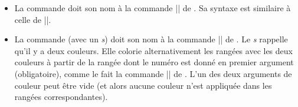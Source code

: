 \documentclass[dvipsnames]{article}%
\begin{document}
\begin{itemize}
\begin{scope}
\hfuzz=10cm
\begin{Code}[width=9cm]
$\begin{NiceArray}{lll}[hvlines]
\CodeBefore
  \emph{\rowcolor{red!15}{1,3-5,8-}}
\Body
a_1 & b_1 & c_1 \\
a_2 & b_2 & c_2 \\
a_3 & b_3 & c_3 \\
a_4 & b_4 & c_4 \\
a_5 & b_5 & c_5 \\
a_6 & b_6 & c_6 \\
a_7 & b_7 & c_7 \\
a_8 & b_8 & c_8 \\
a_9 & b_9 & c_9 \\
a_{10} & b_{10} & c_{10} \\
\end{NiceArray}$
\end{Code}
%
$\begin{NiceArray}{lll}[baseline=4,hvlines,no-cell-nodes]
\CodeBefore
  \rowcolor{red!15}{1,3-5,8-}
\Body
a_1 & b_1 & c_1 \\
a_2 & b_2 & c_2 \\
a_3 & b_3 & c_3 \\
a_4 & b_4 & c_4 \\
a_5 & b_5 & c_5 \\
a_6 & b_6 & c_6 \\
a_7 & b_7 & c_7 \\
a_8 & b_8 & c_8 \\
a_9 & b_9 & c_9 \\
a_{10} & b_{10} & c_{10} \\
\end{NiceArray}$
\end{scope}



\medskip
\item La commande  doit son nom à la
commande |\columncolor| de . Sa syntaxe est similaire à celle de
|\rowcolor|.

\medskip
\item La commande  (avec un \emph{s}) doit
son nom à la commande |\rowcolors| de . Le \emph{s} rappelle qu'il
y a deux couleurs. Elle colorie alternativement les rangées avec les deux
couleurs à partir de la rangée dont le numéro est donné en premier argument
(obligatoire), comme le fait la commande |\rowcolors| de . L'un des
deux arguments de couleur peut être vide (et alors aucune couleur n'est
appliquée dans les rangées correspondantes).


\end{itemize}
\end{document}
